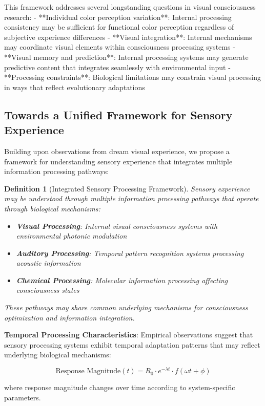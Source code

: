\documentclass[12pt,a4paper]{article}
\newtheorem{definition}[theorem]{Definition}
\begin{document}
This framework addresses several longstanding questions in visual consciousness research:
- **Individual color perception variation**: Internal processing consistency may be sufficient for functional color perception regardless of subjective experience differences
- **Visual integration**: Internal mechanisms may coordinate visual elements within consciousness processing systems
- **Visual memory and prediction**: Internal processing systems may generate predictive content that integrates seamlessly with environmental input
- **Processing constraints**: Biological limitations may constrain visual processing in ways that reflect evolutionary adaptations

\subsection{Towards a Unified Framework for Sensory Experience}

Building upon observations from dream visual experience, we propose a framework for understanding sensory experience that integrates multiple information processing pathways:

\begin{definition}[Integrated Sensory Processing Framework]
Sensory experience may be understood through multiple information processing pathways that operate through biological mechanisms:
\begin{itemize}
\item \textbf{Visual Processing}: Internal visual consciousness systems with environmental photonic modulation
\item \textbf{Auditory Processing}: Temporal pattern recognition systems processing acoustic information
\item \textbf{Chemical Processing}: Molecular information processing affecting consciousness states
\end{itemize}
These pathways may share common underlying mechanisms for consciousness optimization and information integration.
\end{definition}

\textbf{Temporal Processing Characteristics}:
Empirical observations suggest that sensory processing systems exhibit temporal adaptation patterns that may reflect underlying biological mechanisms:

$$\text{Response Magnitude}(t) = R_0 \cdot e^{-\lambda t} \cdot f(\omega t + \phi)$$

where response magnitude changes over time according to system-specific parameters.
\end{document}
